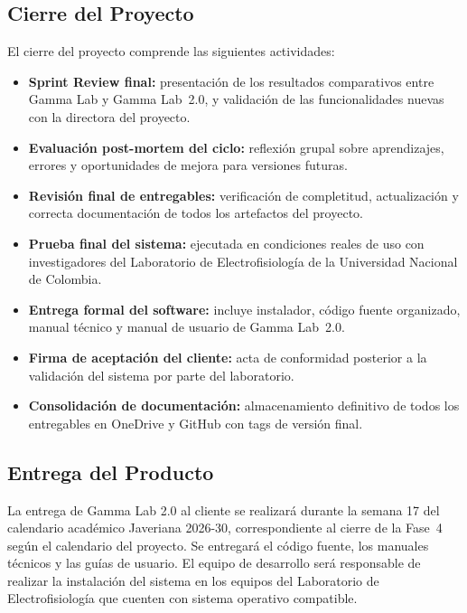 \documentclass{article}
\begin{document}
\subsection{Cierre del Proyecto}

El cierre del proyecto comprende las siguientes actividades:

\begin{itemize}
    \item \textbf{Sprint Review final:} presentación de los resultados
    comparativos entre Gamma Lab y Gamma Lab~2.0, y validación de las
    funcionalidades nuevas con la directora del proyecto.

    \item \textbf{Evaluación post-mortem del ciclo:} reflexión grupal sobre
    aprendizajes, errores y oportunidades de mejora para versiones futuras.

    \item \textbf{Revisión final de entregables:} verificación de
    completitud, actualización y correcta documentación de todos los
    artefactos del proyecto.

    \item \textbf{Prueba final del sistema:} ejecutada en condiciones reales
    de uso con investigadores del Laboratorio de Electrofisiología de la
    Universidad Nacional de Colombia.

    \item \textbf{Entrega formal del software:} incluye instalador, código
    fuente organizado, manual técnico y manual de usuario de Gamma Lab~2.0.

    \item \textbf{Firma de aceptación del cliente:} acta de conformidad
    posterior a la validación del sistema por parte del laboratorio.

    \item \textbf{Consolidación de documentación:} almacenamiento definitivo
    de todos los entregables en OneDrive y GitHub con tags de versión final.
\end{itemize}

\subsection{Entrega del Producto}

La entrega de Gamma Lab 2.0 al cliente se realizará durante la semana 17 del calendario
académico Javeriana 2026-30, correspondiente al cierre de la Fase~4 según el
calendario del proyecto. Se entregará el código fuente, los manuales
técnicos y las guías de usuario. El equipo de desarrollo será responsable
de realizar la instalación del sistema en los equipos del Laboratorio de
Electrofisiología que cuenten con sistema operativo compatible.
\end{document}
